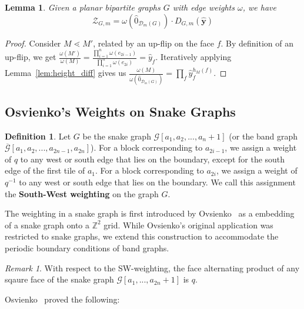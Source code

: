 \documentclass[11pt]{amsart}
\newtheorem{lem}[thm]{Lemma}
\theoremstyle{definition}
\newtheorem{defn}[thm]{Definition}
\theoremstyle{remark}
\newtheorem{rem}[thm]{Remark}
\numberwithin{equation}{section}
\begin{document}
\begin{lem}\label{lem: dimer_face_to_partition}
    Given a planar bipartite graphs $G$ with edge weights $\omega$, we have 
    \begin{equation*}
        \mathcal{Z}_{G,m} = \omega(\hat{0}_{\mathcal{D}_m(G)})\cdot D_{G,m}(\hat{\mathbf{y}}) 
    \end{equation*}
\end{lem}
\begin{proof}
    Consider $M\lessdot M'$, related by an up-flip on the face $f$. By definition of an up-flip, we get $\frac{\omega(M')}{\omega(M)} = \frac{\prod^{n}_{i=1}\omega(e_{2i-1})}{\prod^{n}_{i=1}\omega(e_{2i})} = \hat{y}_f$. Iteratively applying Lemma~\ref{lem:height_diff} gives us $\frac{\omega(M)}{\omega(\hat{0}_{\mathcal{D}_{m}(G)})} = \prod_f \hat{y}_f^{h_M(f)}$.
\end{proof}

\subsection{Osvienko's Weights on Snake Graphs}\label{subsec: SW-weights}

\begin{defn}\label{defn: Ovsienko_SW_weighting}   
    Let $G$ be the snake graph $\mathcal{G}[a_1,a_2,...,a_n+1]$ (or the band graph $\overline{\mathcal{G}}[a_1,a_2,...,a_{2n-1},a_{2n}]$). For a block corresponding to $a_{2i-1}$, we assign a weight of $q$ to any west or south edge that lies on the boundary, except for the south edge of the first tile of $a_1$. For a block corresponding to $a_{2i}$, we assign a weight of $q^{-1}$ to any west or south edge that lies on the boundary. We call this assignment the \textbf{South-West weighting} on the graph $G$.
\end{defn}

The weighting in a snake graph is first introduced by Ovsienko~\cite{ovsienko2025qrationalsdimers} as a embedding of a snake graph onto a $\mathbb{Z}^2$ grid. While Ovsienko's original application was restricted to snake graphs, we extend this construction to accommodate the periodic boundary conditions of band graphs.


\begin{rem}\label{rem: face_prod_of_SW_weights}
    With respect to the SW-weighting, the face alternating product of any sqaure face of the snake graph $\mathcal{G}[a_1,...,a_{2n}+1]$ is $q$.
\end{rem}
Osvienko~\cite{ovsienko2025qrationalsdimers} proved the following:
\end{document}
